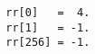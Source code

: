 \begin{comment}
\section{WILSON-BURG SPECTRAL FACTORIZATION}
(If you are new to this material, you should pass over this section.)
Spectral factorization is the job of taking a power spectrum
and from it finding a causal (zero before zero time) filter with that spectrum.
Methods for this task (there are many)
not only produce a causal wavelet,
but they typically produce one whose
convolutional inverse is also causal.
(This is called the ``minimum phase'' property.)
In other words, with such a filter we can do stable deconvolution.
Here
I introduce a new method of spectral factorization
that looks particularly suitable for the task at hand.
I learned this new method from John Parker Burg who
attributes it to an old paper by Wilson
(I find Burg's explanation, below, much clearer than Wilson's.)
\par
\begin{comment}
Below find subroutine \texttt{lapfac()} which
was used in the previous section
to factor the Laplacian operator.
To invoke the factorization subroutine,
you need to supply one side of an autocorrelation function.
For example, let us specify the negative of the 2-D Laplacian
(an autocorrelation)
in a vector {\tt n = }$256\times 256$ points long.
\end{comment}
\par\noindent
\footnotesize
\begin{verbatim}
        rr[0]   =  4.
        rr[1]   = -1.
        rr[256] = -1.
\end{verbatim}
\normalsize
\begin{comment}
\par
Subroutine \texttt{lapfac()}
finds the helical derivative (factored negative Laplacian)
and then prepares the required filter
coefficient tables for the helix convolution
and deconvolution subroutines.
\moddex{lapfac}{factor 2-D Laplacian}
Subroutine \texttt{lapfacn()} has its main job
done by subroutine \texttt{wilson\_factor()} \vpageref{lst:wilson}
shown after the Wilson-Burg theory.
\end{comment}
